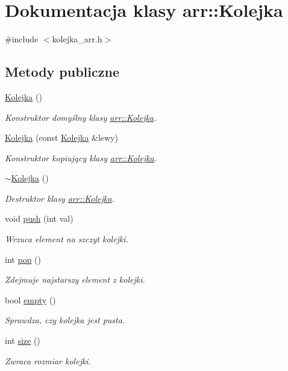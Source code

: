 \hypertarget{classarr_1_1_kolejka}{\section{Dokumentacja klasy arr\-:\-:Kolejka}
\label{classarr_1_1_kolejka}
}


{\ttfamily \#include $<$kolejka\-\_\-arr.\-h$>$}

\subsection*{Metody publiczne}
\begin{DoxyCompactItemize}
\item 
\hyperlink{classarr_1_1_kolejka_a7f2d0e05c25b3a0d10db8e04cd4bdb58}{Kolejka} ()
\begin{DoxyCompactList}\small\item\em Konstruktor domyślny klasy \hyperlink{classarr_1_1_kolejka}{arr\-::\-Kolejka}. \end{DoxyCompactList}\item 
\hyperlink{classarr_1_1_kolejka_a1addd7f5fdee63f093fd971037600b02}{Kolejka} (const \hyperlink{classarr_1_1_kolejka}{Kolejka} \&lewy)
\begin{DoxyCompactList}\small\item\em Konstruktor kopiujący klasy \hyperlink{classarr_1_1_kolejka}{arr\-::\-Kolejka}. \end{DoxyCompactList}\item 
\hyperlink{classarr_1_1_kolejka_a455a5aac4ea9612cab749b8e9edf131d}{$\sim$\-Kolejka} ()
\begin{DoxyCompactList}\small\item\em Destruktor klasy \hyperlink{classarr_1_1_kolejka}{arr\-::\-Kolejka}. \end{DoxyCompactList}\item 
void \hyperlink{classarr_1_1_kolejka_acb08e887411da797ab39960cde892dc5}{push} (int val)
\begin{DoxyCompactList}\small\item\em Wrzuca element na szczyt kolejki. \end{DoxyCompactList}\item 
int \hyperlink{classarr_1_1_kolejka_a9d2c0676d6992ffb3b2aa4cd27ca36af}{pop} ()
\begin{DoxyCompactList}\small\item\em Zdejmuje najstarszy element z kolejki. \end{DoxyCompactList}\item 
bool \hyperlink{classarr_1_1_kolejka_a8ed4d617d36bf539544d1f7e18929bf8}{empty} ()
\begin{DoxyCompactList}\small\item\em Sprawdza, czy kolejka jest pusta. \end{DoxyCompactList}\item 
int \hyperlink{classarr_1_1_kolejka_a1aabde2dffcb50f4d8dc2e7d6df808ce}{size} ()
\begin{DoxyCompactList}\small\item\em Zwraca rozmiar kolejki. \end{DoxyCompactList}\end{DoxyCompactItemize}
